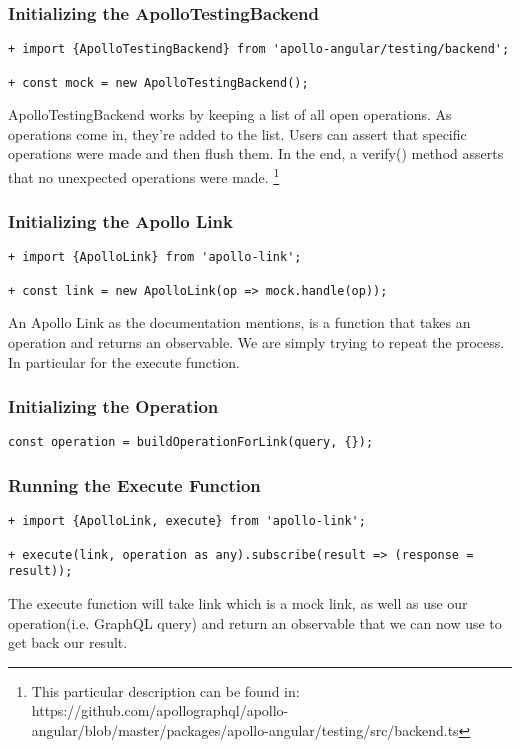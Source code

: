 \subsubsection { Initializing the ApolloTestingBackend }
\begin{lstlisting}
+ import {ApolloTestingBackend} from 'apollo-angular/testing/backend';

+ const mock = new ApolloTestingBackend();
\end{lstlisting}

ApolloTestingBackend works by keeping a list of all open operations.
As operations come in, they're added to the list. Users can assert that specific
operations were made and then flush them. In the end, a verify() method asserts
that no unexpected operations were made.
\footnote{This particular description can be found in: https://github.com/apollographql/apollo-angular/blob/master/packages/apollo-angular/testing/src/backend.ts}

\subsubsection { Initializing the Apollo Link }

\begin{lstlisting}
+ import {ApolloLink} from 'apollo-link';

+ const link = new ApolloLink(op => mock.handle(op));
\end{lstlisting}

An Apollo Link as the documentation mentions, is a function that takes an
operation and returns an observable. We are simply trying to repeat the process.
In particular for the execute function.

\subsubsection { Initializing the Operation }
\begin{lstlisting}
const operation = buildOperationForLink(query, {});
\end{lstlisting}

\subsubsection { Running the Execute Function }
\begin{lstlisting}
+ import {ApolloLink, execute} from 'apollo-link';

+ execute(link, operation as any).subscribe(result => (response = result));
\end{lstlisting}

The execute function will take link which is a mock link, as well as use our
operation(i.e. GraphQL query) and return an observable that we can now use to
get back our result.
